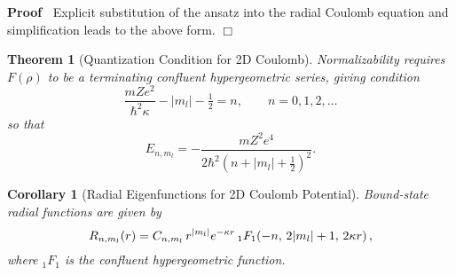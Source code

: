 \documentclass{article}
\newenvironment{proof}{\noindent\textbf{Proof\ }}{\hspace*{\fill}$\Box$\medskip}
\newtheorem{corollary}{Corollary}
\newtheorem{theorem}{Theorem}
\begin{document}
\begin{proof}
  Explicit substitution of the ansatz into the radial Coulomb equation and
  simplification leads to the above form.
\end{proof}

\begin{theorem}
  [Quantization Condition for 2D Coulomb] Normalizability requires $F (\rho)$
  to be a terminating confluent hypergeometric series, giving condition
  \begin{equation}
    \frac{mZe^2}{\hbar^2 \kappa} - |m_l | - \tfrac{1}{2} = n, \qquad n = 0, 1,
    2, \ldots
  \end{equation}
  so that
  \begin{equation}
    E_{n, m_l} = - \frac{mZ^2 e^4}{2 \hbar^2  (n + |m_l | + \tfrac{1}{2})^2} .
  \end{equation}
\end{theorem}

\begin{corollary}
  [Radial Eigenfunctions for 2D Coulomb Potential] Bound-state radial
  functions are given by
  \begin{equation}
    R_{n, m_l} (r) = C_{n, m_l}  \hspace{0.17em} r^{|m_l |} e^{- \kappa r} 
    \hspace{0.17em}_1 F_1 \hspace{-0.17em} \left( - n, \hspace{0.17em} 2| m_l
    | + 1, \hspace{0.17em} 2 \kappa r \right),
  \end{equation}
  where $_1 F_1$ is the confluent hypergeometric function.
\end{corollary}
\end{document}
